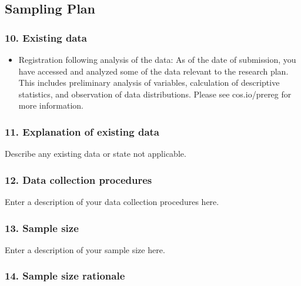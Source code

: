 \documentclass[
]{article}
\providecommand{\tightlist}{%
  \setlength{\itemsep}{0pt}\setlength{\parskip}{0pt}}
\begin{document}
\hypertarget{sampling-plan}{%
\subsection{Sampling Plan}\label{sampling-plan}}

\hypertarget{existing-data}{%
\subsubsection{10. Existing data}\label{existing-data}}

\begin{itemize}
\tightlist
\item
  Registration following analysis of the data: As of the date of
  submission, you have accessed and analyzed some of the data relevant
  to the research plan. This includes preliminary analysis of variables,
  calculation of descriptive statistics, and observation of data
  distributions. Please see cos.io/prereg for more information.
\end{itemize}

\hypertarget{explanation-of-existing-data}{%
\subsubsection{11. Explanation of existing
data}\label{explanation-of-existing-data}}

Describe any existing data or state not applicable.

\hypertarget{data-collection-procedures}{%
\subsubsection{12. Data collection
procedures}\label{data-collection-procedures}}

Enter a description of your data collection procedures here.

\hypertarget{sample-size}{%
\subsubsection{13. Sample size}\label{sample-size}}

Enter a description of your sample size here.

\hypertarget{sample-size-rationale}{%
\subsubsection{14. Sample size rationale}\label{sample-size-rationale}}
\end{document}

